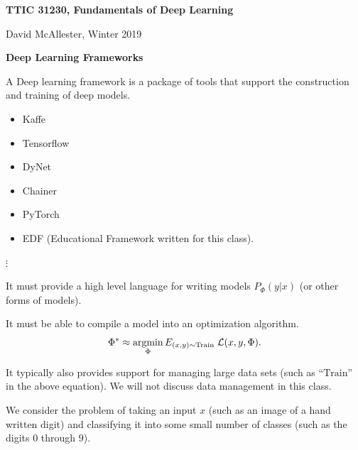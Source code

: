 



{\Huge
  
  \centerline{\bf TTIC 31230, Fundamentals of Deep Learning}
  \bigskip
  \centerline{David McAllester, Winter 2019}
  \vfill
  \vfill
  \centerline{\bf Deep Learning Frameworks}
  \vfill
  \vfill


A Deep learning framework is a package of tools that support the construction and training of deep models.

\begin{itemize}
  
\item Kaffe

\vfill

\item Tensorflow

\vfill

\item DyNet

  \vfill
\item Chainer

\vfill

\item PyTorch

  \vfill

\item EDF (Educational Framework written for this class).
\end{itemize}

$\vdots$


It must provide a high level language for writing models $P_\Phi(y|x)$ (or other forms of models).

\vfill
It must be able to compile a model into an optimization algorithm.
\vfill
$$\Phi^* \approx \operatorname*{argmin}_\Phi E_{(x,y) \sim \mathrm{Train}} \; {\cal L}(x,y,\Phi).$$

\vfill
It typically also provides support for managing large data sets (such as ``$\mathrm{Train}$'' in the above equation).  We will not discuss data management in this class.


We consider the problem of taking an input $x$ (such as an image of a hand written digit) and classifying it into some small number of classes (such as the digits $0$ through $9$).

}
